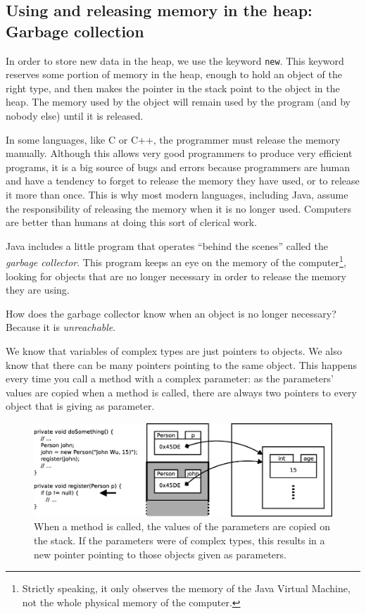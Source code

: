 \subsection{Using and releasing memory in the heap: Garbage collection}
\label{sec:garbage-collection}

In order to store new data in the heap, we use the keyword
\verb+new+. This keyword reserves some portion of memory in the heap,
enough to hold an object of the right type, and then makes the pointer
in the stack point to the object in the heap. The memory used by the
object will remain used by the program (and by nobody else) until it
is released. 

In some languages, like C or C++, the programmer must release the
memory manually. Although this allows very good programmers to produce
very efficient programs, it is a big source of bugs and errors because
programmers are human and have a tendency to forget to release the
memory they have used, or to release it more than once. This
is why most modern languages, including Java, assume the
responsibility of releasing the memory when it is no longer
used. Computers are better than humans at doing this sort of clerical
work. 

Java includes a little program that operates ``behind the scenes''
called the \emph{garbage collector}. This program keeps an eye on the memory
of the computer\footnote{Strictly speaking, it only observes the
  memory of the Java Virtual Machine, not the whole physical memory of
the computer.}, looking for objects that are no longer necessary in order
to release the memory they are using. 

How does the garbage collector know when an object is no longer
necessary? Because it is \emph{unreachable}. 

We know that variables of complex types are just pointers to
objects. We also know that there can be many pointers pointing to the
same object. This happens every time you call a method with a complex
parameter: as the parameters' values are copied when a method is
called, there are always two pointers to every object that is
giving as parameter. 

\begin{figure}[bhtp]
  \centering
  \includegraphics[width=\textwidth]{gfx/parameter-stack-2}
  \caption{When a method is called, the values of the parameters are
    copied on the stack. If the parameters were of complex types, this
    results in a new pointer pointing to those objects given as
    parameters.}
  \label{fig:padfsajdghshdg}
\end{figure}

